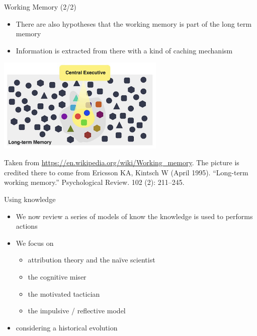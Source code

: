\documentclass{beamer}
\begin{document}
\begin{frame}
{\centerline{Working Memory (2/2)}}
\begin{itemize}
    \item There are also hypotheses that the working memory is part of the long term memory
    \item Information is extracted from there with a kind of caching mechanism
\end{itemize} 

\begin{center}

 \includegraphics[width=8cm]{P2023.AIBCCSS.KnowledgeAcquisitionRetentionUse/WorkingMemoryPartOfLongTermMemory.jpg}
 
 \end{center}

\begin{center}
    \tiny{Taken from \url{https://en.wikipedia.org/wiki/Working_memory}. The picture is credited there to come from Ericsson KA, Kintsch W (April 1995). ``Long-term working memory.'' Psychological Review. 102 (2): 211–245. }
\end{center}

\end{frame}



\begin{frame}
{\centerline{Using knowledge}}
\begin{itemize}
    \item We now review a series of models of know the knowledge is used to performs actions
    \item We focus on
    \begin{itemize}
        \item attribution theory and the na\"{i}ve scientist
        \item the cognitive miser 
        \item the motivated tactician
        \item the impulsive / reflective model
    \end{itemize}
    \item considering a historical evolution
\end{itemize} 
\end{frame}
\end{document}
